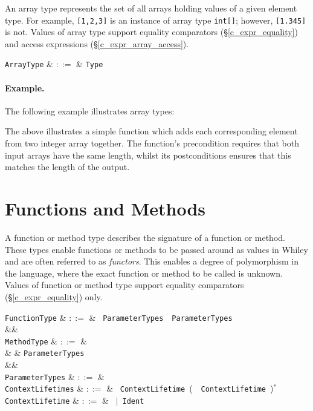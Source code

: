 An array type represents the set of all arrays holding values of a given element type. For example, \lstinline{[1,2,3]} is an instance of array type \lstinline{int[]}; however, \lstinline{[1.345]} is not.  Values of array type support equality comparators (\S\ref{c_expr_equality}) and access expressions (\S\ref{c_expr_array_access}).

\begin{syntax}
  \verb+ArrayType+ & $::=$ & \verb+Type+ \ \token{[}\ \token{]}\\
\end{syntax}

\paragraph{Example.} The following example illustrates array types:



The above illustrates a simple function which adds each corresponding element from two integer array together.  The function's \gls{precondition} requires that both input arrays have the same length, whilst its \gls{postcondition}s ensures that this matches the length of the output.


\section{Functions and Methods}
A function or method type describes the signature of a function or method.  These types enable functions or methods to be passed around as values in Whiley and are often referred to as {\em functors}.  This enables a degree of polymorphism in the language, where the exact function or method to be called is unknown.   Values of function or method type support equality comparators (\S\ref{c_expr_equality}) only.

\begin{syntax}
  \verb+FunctionType+ & $::=$ & \ \verb+ParameterTypes+\ \token{->}\ \verb+ParameterTypes+\\
  &&\\
  \verb+MethodType+ & $::=$ & \ \\
                    &       & \verb+ParameterTypes+\ \\
  &&\\
  \verb+ParameterTypes+ & $::=$ & \token{(}\ \ \token{)}\\
  \verb+ContextLifetimes+ & $::=$ & \token{[}\ \verb+ContextLifetime+\ \big(\ \token{,}\ \verb+ContextLifetime+\ \big)$^*$\ \token{]}\\
  \verb+ContextLifetime+ & $::=$ & \ $|$\ \verb+Ident+\\
\end{syntax}

